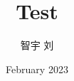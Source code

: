 


% 







% 

\documentclass{article}
\usepackage{graphicx} %
\usepackage[UTF8]{ctex}
\usepackage{lipsum}
\usepackage{biblatex}



\title{Test}
\author{智宇 刘}
\date{February 2023}



    \maketitle

    \tableofcontents

\section{Introduction}

